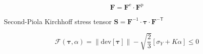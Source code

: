 
\begin{equation}
\bm{F} = \bm{F}^\mathrm{e} \cdot \bm{F}^\mathrm{p}
\end{equation}

Second-Piola Kirchhoff stress tensor $\bm{S} = \bm{F}^{-1} \cdot \bm{\tau} \cdot \bm{F}^\mathsf{-T}$

\begin{equation}
\mathscr{F} (\bm{\tau}, \alpha) = \| \mathrm{dev}[\bm{\tau}] \| - \sqrt{\frac{2}{3}} \left[ \sigma_Y + K\alpha \right] \le 0
\end{equation}
